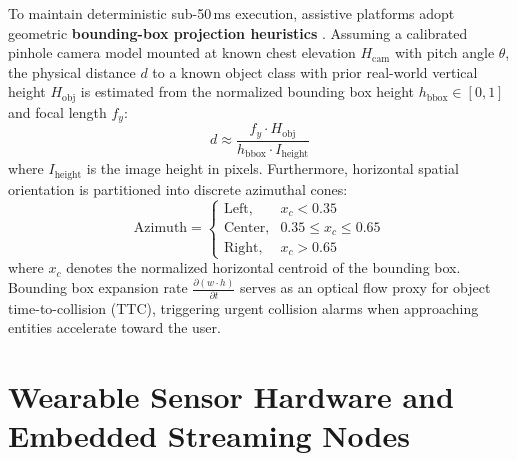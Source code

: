 \documentclass[10pt,twocolumn]{article}
\begin{document}
To maintain deterministic sub-50\,ms execution, assistive platforms adopt geometric \textbf{bounding-box projection heuristics} \cite{bhowmick2017vision}. Assuming a calibrated pinhole camera model mounted at known chest elevation $H_{\text{cam}}$ with pitch angle $\theta$, the physical distance $d$ to a known object class with prior real-world vertical height $H_{\text{obj}}$ is estimated from the normalized bounding box height $h_{\text{bbox}} \in [0, 1]$ and focal length $f_y$:
\begin{equation}
    d \approx \frac{f_y \cdot H_{\text{obj}}}{h_{\text{bbox}} \cdot I_{\text{height}}}
\end{equation}
where $I_{\text{height}}$ is the image height in pixels. Furthermore, horizontal spatial orientation is partitioned into discrete azimuthal cones:
\begin{equation}
    \text{Azimuth} = 
    \begin{cases} 
        \text{Left}, & x_c < 0.35 \\
        \text{Center}, & 0.35 \le x_c \le 0.65 \\
        \text{Right}, & x_c > 0.65 
    \end{cases}
\end{equation}
where $x_c$ denotes the normalized horizontal centroid of the bounding box. Bounding box expansion rate $\frac{\partial (w \cdot h)}{\partial t}$ serves as an optical flow proxy for object time-to-collision (TTC), triggering urgent collision alarms when approaching entities accelerate toward the user.

\section{Wearable Sensor Hardware and Embedded Streaming Nodes}
\label{sec:hardware}
\end{document}
